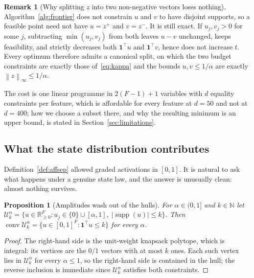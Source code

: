 \documentclass[preprint,12pt]{elsarticle}
\newtheorem{proposition}[theorem]{Proposition}
\theoremstyle{definition}
\newtheorem{remark}[theorem]{Remark}
\newcommand{\R}{\mathbb{R}}
\newcommand{\norm}[1]{\left\lVert #1 \right\rVert}
\begin{document}
\begin{remark}[Why splitting $z$ into two non-negative vectors loses nothing]
\label{rem:split}
Algorithm~\ref{alg:frontier} does not constrain $u$ and $v$ to have disjoint supports, so a
feasible point need not have $u=z^{+}$ and $v=z^{-}$. It is still exact. If
$u_j,v_j>0$ for some $j$, subtracting $\min(u_j,v_j)$ from both leaves $u-v$ unchanged, keeps
feasibility, and strictly decreases both $\mathbf 1^{\top}u$ and $\mathbf 1^{\top}v$, hence does
not increase $t$. Every optimum therefore admits a canonical split, on which the two budget
constraints are exactly those of~\eqref{eq:kappa} and the bounds $u,v\le1/\alpha$ are exactly
$\norm{z}_\infty\le1/\alpha$.
\end{remark}

The cost is one linear programme in $2(F-1)+1$ variables with $d$ equality constraints per
feature, which is affordable for every feature at $d=50$ and not at $d=400$; how we choose a
subset there, and why the resulting minimum is an upper bound, is stated in
Section~\ref{sec:limitations}.

\subsection{What the state distribution contributes}
\label{sec:frontier-amplitudes}

Definition~\ref{def:affsep} allowed graded activations in $[0,1]$. It is natural to ask what
happens under a genuine state law, and the answer is unusually clean: almost nothing survives.

\begin{proposition}[Amplitudes wash out of the hulls]
\label{prop:knapsack}
For $\alpha\in(0,1]$ and $k\in\mathbb N$ let
$\mathcal U_k^{\alpha}=\{u\in\R_{\ge0}^{F}:u_j\in\{0\}\cup[\alpha,1],\;
|\operatorname{supp}(u)|\le k\}$. Then
$\operatorname{conv}\mathcal U_k^{\alpha}=\{u\in[0,1]^F:\mathbf 1^{\top}u\le k\}$ for every
$\alpha$.
\end{proposition}

\begin{proof}
The right-hand side is the unit-weight knapsack polytope, which is integral: its vertices are the
$0/1$ vectors with at most $k$ ones. Each such vertex lies in $\mathcal U_k^{\alpha}$ for every
$\alpha\le1$, so the right-hand side is contained in the hull; the reverse inclusion is immediate
since $\mathcal U_k^{\alpha}$ satisfies both constraints.
\end{proof}
\end{document}
